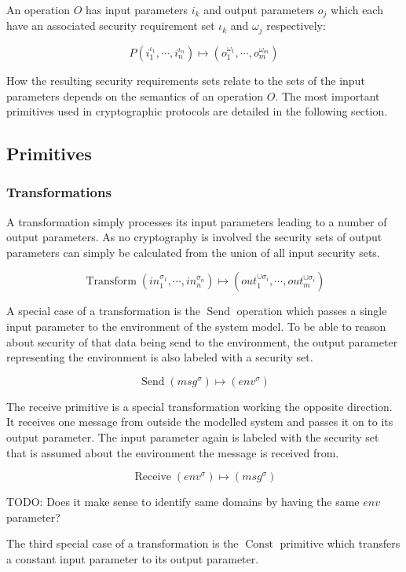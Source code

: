 \documentclass[a4paper]{article}
\DeclareMathOperator{\trans}{Transform}
\DeclareMathOperator{\send}{Send}
\DeclareMathOperator{\recv}{Receive}
\DeclareMathOperator{\const}{Const}
\newcommand{\TODO}[1]{\small\noindent\color{red} TODO: #1\color{black}}
\begin{document}
An operation $O$ has input parameters $i_k$ and output parameters $o_j$ which
each have an associated security requirement set $\iota_k$ and $\omega_j$
respectively:

$$P(i_1^{\iota_1}, \cdots, i_n^{\iota_n}) \mapsto (o_1^{\omega_1}, \cdots, o_m^{\omega_m})$$

How the resulting security requirements sets relate to the sets of the input
parameters depends on the semantics of an operation $O$. The most important
primitives used in cryptographic protocols are detailed in the following
section.

\subsection{Primitives}

\subsubsection{Transformations}

A transformation simply processes its input parameters leading to a number of
output parameters. As no cryptography is involved the security sets of output
parameters can simply be calculated from the union of all input security sets.

$$\trans(in_1^{\sigma_1}, \cdots, in_n^{\sigma_n}) \mapsto (out_1^{\cup\sigma_i},\cdots,out_m^{\cup\sigma_i})$$

A special case of a transformation is the $\send$ operation which passes a
single input parameter to the environment of the system model. To be able to
reason about security of that data being send to the environment, the output
parameter representing the environment is also labeled with a security set.

$$\send(msg^\sigma) \mapsto (env^{\sigma})$$

The receive primitive is a special transformation working the opposite
direction. It receives one message from outside the modelled system and passes
it on to its output parameter. The input parameter again is labeled with the
security set that is assumed about the environment the message is received
from.

$$\recv(env^\sigma) \mapsto (msg^\sigma)$$

\TODO{Does it make sense to identify same domains by having the same $env$ parameter?}

The third special case of a transformation is the $\const$ primitive which
transfers a constant input parameter to its output parameter.
\end{document}
